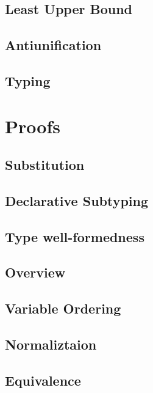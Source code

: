 \documentclass[a4,natbib=false]{article}
\begin{document}
\subsection{Least Upper Bound}
\ottdefnsLUB

\subsection{Antiunification}
\ottdefnsAU

\subsection{Typing}
\ottdefnsAT

\section{Proofs}

\subsection{Substitution}


\subsection{Declarative Subtyping}



\subsection{Type well-formedness}


\subsection{Overview}


\subsection{Variable Ordering}


\subsection{Normaliztaion}


\subsection{Equivalence}

\end{document}
